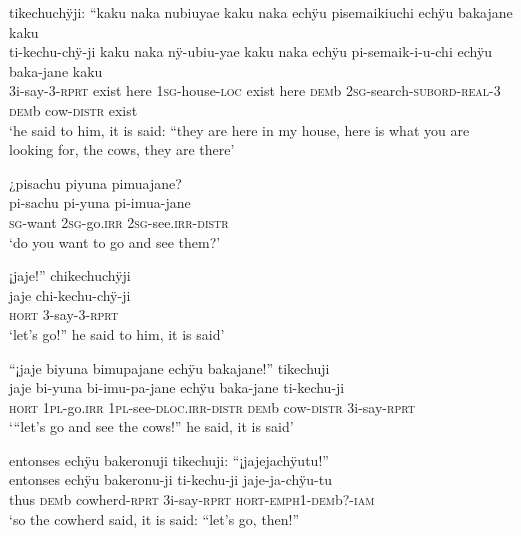 \ea%
\begingl 
\glpreamble tikechuchÿji: “kaku naka nubiuyae kaku naka echÿu pisemaikiuchi echÿu bakajane kaku\\
\gla ti-kechu-chÿ-ji kaku naka nÿ-ubiu-yae kaku naka echÿu pi-semaik-i-u-chi echÿu baka-jane kaku\\ 
\glb 3i-say-3-\textsc{rprt} exist here 1\textsc{sg}-house-\textsc{loc} exist here \textsc{dem}b 2\textsc{sg}-search-\textsc{subord}-\textsc{real}-3 \textsc{dem}b cow-\textsc{distr} exist\\ 
\glft ‘he said to him, it is said: “they are here in my house, here is what you are looking for, the cows, they are there’\\ 
\endgl
\xe

\ea%
\begingl 
\glpreamble ¿pisachu piyuna pimuajane?\\
\gla pi-sachu pi-yuna pi-imua-jane\\ 
\textsc{sg}-want 2\textsc{sg}-go.\textsc{irr} 2\textsc{sg}-see.\textsc{irr}-\textsc{distr}\\ 
\glft ‘do you want to go and see them?’\\ 
\endgl
\xe


\ea%
\begingl 
\glpreamble ¡jaje!” chikechuchÿji\\
\gla jaje chi-kechu-chÿ-ji\\ 
\glb \textsc{hort} 3-say-3-\textsc{rprt}\\ 
\glft ‘let’s go!” he said to him, it is said’\\ 
\endgl
\xe

\newpage

\ea%
\begingl 
\glpreamble “¡jaje biyuna bimupajane echÿu bakajane!” tikechuji\\
\gla jaje bi-yuna bi-imu-pa-jane echÿu baka-jane ti-kechu-ji\\ 
\glb \textsc{hort} 1\textsc{pl}-go.\textsc{irr} 1\textsc{pl}-see-\textsc{dloc.irr}-\textsc{distr} \textsc{dem}b cow-\textsc{distr} 3i-say-\textsc{rprt}\\ 
\glft ‘“let’s go and see the cows!” he said, it is said’\\ 
\endgl
\xe

\ea%
\begingl 
\glpreamble entonses echÿu bakeronuji tikechuji: “¡jajejachÿutu!”\\
\gla entonses echÿu bakeronu-ji ti-kechu-ji jaje-ja-chÿu-tu\\ 
\glb thus \textsc{dem}b cowherd-\textsc{rprt} 3i-say-\textsc{rprt} \textsc{hort}-\textsc{emph}1-\textsc{dem}b?-\textsc{iam}\\ 
\glft ‘so the cowherd said, it is said: “let’s go, then!”\\ 
\endgl
\xe

